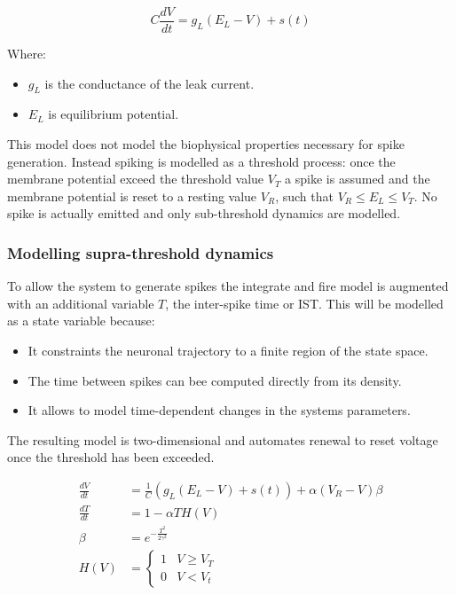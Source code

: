 		$$C\frac{dV}{dt} = g_L(E_L-V)+s(t)$$

		Where:

		\begin{itemize}
			\item $g_L$ is the conductance of the leak current.
			\item $E_L$ is equilibrium potential.
		\end{itemize}

		This model does not model the biophysical properties necessary for spike generation.
		Instead spiking is modelled as a threshold process: once the membrane potential exceed the threshold value $V_T$ a spike is assumed and the membrane potential is reset to a resting value $V_R$, such that $V_R\le E_L\le V_T$.
		No spike is actually emitted and only sub-threshold dynamics are modelled.

		\subsubsection{Modelling supra-threshold dynamics}
		To allow the system to generate spikes the integrate and fire model is augmented with an additional variable $T$, the inter-spike time or IST.
		This will be modelled as a state variable because:

		\begin{itemize}
			\item It constraints the neuronal trajectory to a finite region of the state space.
			\item The time between spikes can bee computed directly from its density.
			\item It allows to model time-dependent changes in the systems parameters.
		\end{itemize}

		The resulting model is two-dimensional and automates renewal to reset voltage once the threshold has been exceeded.


		\begin{equation}
			\begin{aligned}
				\frac{dV}{dt} &= \frac{1}{C}(g_L(E_L-V)+s(t)) + \alpha(V_R-V)\beta\\
				\frac{dT}{dt} &= 1-\alpha TH(V)\\
				\beta &=e^{-\frac{T^2}{2\gamma^2}}\\
				H(V) &= \begin{cases}1 & V\ge V_T\\0&V < V_t\end{cases}
				\label{eqs:supra-threshold}
			\end{aligned}
		\end{equation}


